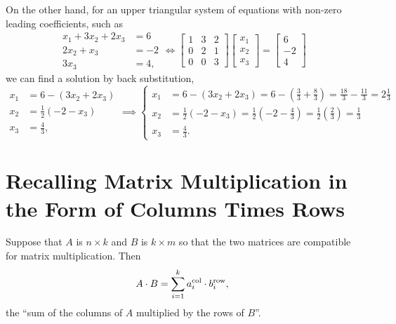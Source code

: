On the other hand, for an upper triangular system of equations with non-zero leading coefficients, such as
\begin{equation}
    \begin{aligned}
     x_1 + 3x_2 + 2 x_3 &=6 \\
     2 x_2 +x_3 &= -2\\
     3 x_3 &= 4,
    \end{aligned} \iff \left[\begin{array}{rrr} 1 & 3 & 2\\ 0 & 2 & 1 \\   0 & 0 & 3 \end{array} \right] \begin{bmatrix} x_1 \\ x_2 \\ x_3\end{bmatrix} = \left[\begin{array}{r} 6 \\ -2 \\ 4\end{array} \right]
\end{equation}
we can find a solution by back substitution,
\begin{equation}
    \begin{aligned}
         x_1  &=6- (3x_2 + 2 x_3) \\
      x_2 &= \frac{1}{2} \left( -2-x_3 \right) \\
      x_3 &= \frac{4}{3},
    \end{aligned} \implies \left\{ 
    \begin{aligned}
         x_1  &=6- (3x_2 + 2 x_3) = 6 -( \frac{3}{3} + \frac{8}{3})=\frac{18}{3}-\frac{11}{3}=2 \frac{1}{3} \\
        x_2 &= \frac{1}{2} \left( -2-x_3 \right) = \frac{1}{2} \left( -2-\frac{4}{3} \right)= \frac{1}{2} \left(\frac{2}{3}\right) = \frac{1}{3}\\
      x_3 &= \frac{4}{3}.
    \end{aligned}  \right.
\end{equation}

\section{Recalling Matrix Multiplication in the Form of Columns Times Rows}

Suppose that $A$ is $n \times k$ and $B$ is $k \times m$ so that the two matrices are compatible for matrix multiplication. Then 
$$A\cdot B = \sum_{i=1}^{k} a_i^{\rm col} \cdot b_i^{\rm row},  $$
the ``sum of the columns of $A$ multiplied by the rows of $B$''.\\

